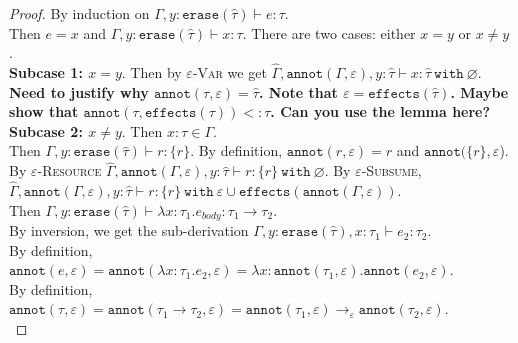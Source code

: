 \documentclass{llncs}
\newcommand{\keywadj}[1]{\mathtt{#1}}
\newcommand{\keyw}[1]{\keywadj{#1}~}
\newcommand{\kw}[1]{\keyw{ #1 }}
\newcommand{\kwa}[1]{\keywadj{ #1 }}
\begin{document}
\begin{proof}
By induction on $\Gamma, y: \kwa{erase}(\hat \tau) \vdash e: \tau$.\\

\noindent
{} Then $e=x$ and $\Gamma, y: \kwa{erase}(\hat \tau) \vdash x: \tau$. There are two cases: either $x=y$ or $x \neq y$. \\

\noindent
\textbf{Subcase 1: $x = y$}. Then by \textsc{$\varepsilon$-Var} we get $\hat \Gamma, \kwa{annot}(\Gamma, \varepsilon), y: \hat \tau \vdash x: \hat \tau~\kw{with} \varnothing$. \textbf{Need to justify why $\kwa{annot}(\tau, \varepsilon) = \hat \tau$. Note that $\varepsilon = \kwa{effects}(\hat \tau)$. Maybe show that $\kwa{annot}(\tau, \kwa{effects}(\tau)) <: \tau$. Can you use the lemma here?}\\

\noindent
\textbf{Subcase 2: $x \neq y$}. Then $x: \tau \in \Gamma$. \\

\noindent
{} Then $\Gamma, y: \kwa{erase}(\hat \tau) \vdash r : \{ r \}$. By definition, $\kwa{annot}(r, \varepsilon) = r$ and $\kwa{annot}(\{ r \}, \varepsilon$). By \textsc{$\varepsilon$-Resource}  $\hat \Gamma, \kwa{annot}(\Gamma, \varepsilon), y: \hat \tau \vdash r: \{ r \}~\kw{with} \varnothing$. By \textsc{$\varepsilon$-Subsume}, $\hat \Gamma, \kwa{annot}(\Gamma, \varepsilon), y: \hat \tau \vdash r: \{ r \}~\kw{with} \varepsilon \cup \kwa{effects}(\kwa{annot}(\Gamma, \varepsilon))$. \\

\noindent
{} Then $\Gamma, y: \kwa{erase}(\hat \tau) \vdash \lambda x: \tau_1.e_{body} : \tau_1 \rightarrow \tau_2$. \\

\noindent
By inversion, we get the sub-derivation $\Gamma, y: \kwa{erase}(\hat \tau), x:\tau_1  \vdash e_2: \tau_2$. \\

\noindent
By definition, $\kwa{annot}(e, \varepsilon) = \kwa{annot}(\lambda x: \tau_1.e_2, \varepsilon) = \lambda x: \kwa{annot}(\tau_1, \varepsilon).\kwa{annot}(e_2, \varepsilon)$. \\

\noindent
By definition, $\kwa{annot}(\tau, \varepsilon) = \kwa{annot}(\tau_1 \rightarrow \tau_2, \varepsilon) = \kwa{annot}(\tau_1, \varepsilon) \rightarrow_{\varepsilon} \kwa{annot}(\tau_2, \varepsilon)$. \\


\end{proof}
\end{document}
